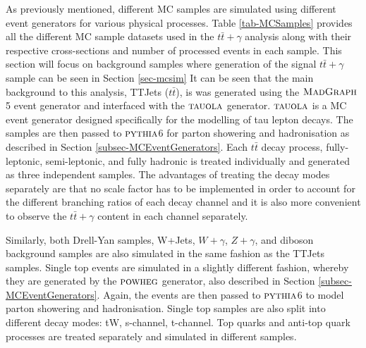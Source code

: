 As previously mentioned, different MC samples are simulated using different event generators for various physical processes. Table \ref{tab-MCSamples} provides all the different MC sample datasets used in the $t\bar{t}+\gamma$ analysis along with their respective cross-sections and number of processed events in each sample. This section will focus on background samples where generation of the signal $t\bar{t}+\gamma$ sample can be seen in Section \ref{sec-mcsim} It can be seen that the main background to this analysis, TTJets ($t\bar{t}$), is was generated using the $\textsc{MadGraph}$5 event generator and interfaced with the $\textsc{tauola}$ generator. $\textsc{tauola}$ is a MC event generator designed specifically for the modelling of tau lepton decays. The samples are then passed to ${\textsc{pythia}}$6 for parton showering and hadronisation as described in Section \ref{subsec-MCEventGenerators}. Each $t\bar{t}$ decay process, fully-leptonic, semi-leptonic, and fully hadronic is treated individually and generated as three independent samples. The advantages of treating the decay modes separately are that no scale factor has to be implemented in order to account for the different branching ratios of each decay channel and it is also more convenient to observe the $t\bar{t}+\gamma$ content in each channel separately.

Similarly, both Drell-Yan samples, W+Jets, $W+\gamma$, $Z+\gamma$, and diboson background samples are also simulated in the same fashion as the TTJets samples. Single top events are simulated in a slightly different fashion, whereby they are generated by the ${\textsc{powheg}}$ generator, also described in Section \ref{subsec-MCEventGenerators}. Again, the events are then passed to ${\textsc{pythia}}$6 to model parton showering and hadronisation. Single top samples are also split into different decay modes: tW, s-channel, t-channel. Top quarks and anti-top quark processes are treated separately and simulated in different samples.

